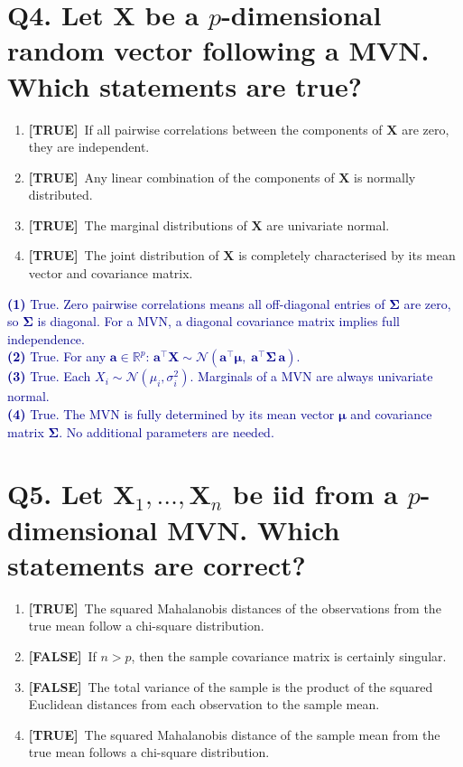 \documentclass[12pt, a4paper]{article}
\newcommand{\T}{\textcolor{truegreen}{\textbf{[TRUE]}}}
\newcommand{\F}{\textcolor{falsered}{\textbf{[FALSE]}}}
\newcommand{\expl}[1]{\textcolor{darkblue}{\small #1}}
\begin{document}
\vspace{1.5em}

\section*{Q4. Let $\mathbf{X}$ be a $p$-dimensional random vector following a MVN. Which statements are true?}

\begin{enumerate}[label=(\arabic*)]
  \item \T\ If all pairwise correlations between the components of $\mathbf{X}$ are zero, they are independent.
  \item \T\ Any linear combination of the components of $\mathbf{X}$ is normally distributed.
  \item \T\ The marginal distributions of $\mathbf{X}$ are univariate normal.
  \item \T\ The joint distribution of $\mathbf{X}$ is completely characterised by its mean vector and covariance matrix.
\end{enumerate}

\expl{
\textbf{(1)} True. Zero pairwise correlations means all off-diagonal entries of $\boldsymbol{\Sigma}$ are zero, so $\boldsymbol{\Sigma}$ is diagonal. For a MVN, a diagonal covariance matrix implies full independence.\\
\textbf{(2)} True. For any $\mathbf{a} \in \mathbb{R}^p$: $\mathbf{a}^\top \mathbf{X} \sim \mathcal{N}(\mathbf{a}^\top \boldsymbol{\mu},\; \mathbf{a}^\top \boldsymbol{\Sigma}\, \mathbf{a})$.\\
\textbf{(3)} True. Each $X_i \sim \mathcal{N}(\mu_i, \sigma_i^2)$. Marginals of a MVN are always univariate normal.\\
\textbf{(4)} True. The MVN is fully determined by its mean vector $\boldsymbol{\mu}$ and covariance matrix $\boldsymbol{\Sigma}$. No additional parameters are needed.
}

\vspace{1.5em}

\section*{Q5. Let $\mathbf{X}_1, \ldots, \mathbf{X}_n$ be iid from a $p$-dimensional MVN. Which statements are correct?}

\begin{enumerate}[label=(\arabic*)]
  \item \T\ The squared Mahalanobis distances of the observations from the true mean follow a chi-square distribution.
  \item \F\ If $n > p$, then the sample covariance matrix is certainly singular.
  \item \F\ The total variance of the sample is the product of the squared Euclidean distances from each observation to the sample mean.
  \item \T\ The squared Mahalanobis distance of the sample mean from the true mean follows a chi-square distribution.
\end{enumerate}
\end{document}
